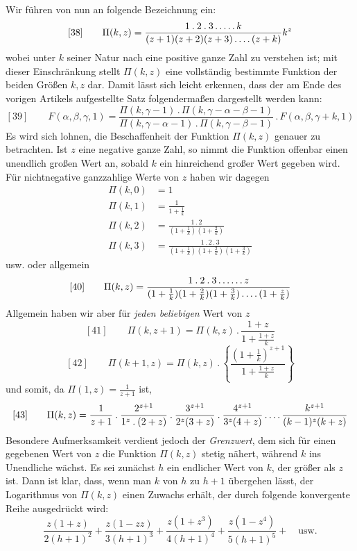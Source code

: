 Wir führen von nun an folgende Bezeichnung ein:
\[
[38]\qquad \Pi(k,z)=\frac{1\mathbin{.}2\mathbin{.}3\mathinner{.\,.\,.\,.\,.}k}{(z+1)(z+2)(z+3)\mathinner{.\,.\,.\,.}(z+k)}k^z
\]
wobei unter $k$ seiner Natur nach eine positive ganze Zahl zu verstehen ist; mit dieser Einschränkung stellt $\Pi(k,z)$ eine vollständig bestimmte Funktion der beiden Größen $k,z$ dar. Damit lässt sich leicht erkennen, dass der am Ende des vorigen Artikels aufgestellte Satz folgendermaßen dargestellt werden kann:
\[
[39]\qquad F(\alpha,\beta,\gamma,1)=\frac{\Pi(k,\gamma-1)\mathbin{.}\Pi(k,\gamma-\alpha-\beta-1)}{\Pi(k,\gamma-\alpha-1)\mathbin{.}\Pi(k,\gamma-\beta-1)}\mathbin{.}F(\alpha,\beta,\gamma+k,1)
\]
Es wird sich lohnen, die Beschaffenheit der Funktion $\Pi(k,z)$ genauer zu betrachten. Ist $z$ eine negative ganze Zahl, so nimmt die Funktion offenbar einen unendlich großen Wert an, sobald $k$ ein hinreichend großer Wert gegeben wird. Für nichtnegative ganzzahlige Werte von $z$ haben wir dagegen
\[
\begin{aligned}
\Pi(k,0)&=1\\[5pt]
\Pi(k,1)&=\frac{1}{1+\frac1k}\\[5pt]
\Pi(k,2)&=\frac{1\mathbin{.}2}{(1+\frac1k)(1+\frac2k)}\\[5pt]
\Pi(k,3)&=\frac{1\mathbin{.}2\mathbin{.}3}{(1+\frac1k)(1+\frac2k)(1+\frac3k)}
\end{aligned}
\]
usw. oder allgemein
\[
[40]\qquad \Pi(k,z)=\frac{1\mathbin{.}2\mathbin{.}3\mathinner{.\,.\,.\,.\,.\,.}z}{(1+\frac1k)(1+\frac2k)(1+\frac3k)\mathinner{.\,.\,.\,.}(1+\frac zk)}
\]
Allgemein haben wir aber für \textit{jeden beliebigen} Wert von $z$
\[
[41]\qquad \Pi(k,z+1)=\Pi(k,z)\mathbin{.}\frac{1+z}{1+\frac{1+z}{k}}
\]
\[
[42]\qquad \Pi(k+1,z)=\Pi(k,z)\mathbin{.}\left\{\frac{(1+\frac1k)^{z+1}}{1+\frac{1+z}{k}}\right\}
\]
und somit, da $\Pi(1,z)=\frac1{z+1}$ ist,
\[
[43]\qquad \Pi(k,z)=\frac1{z+1}\mathbin{.}\frac{2^{z+1}}{1^z\mathbin{.}(2+z)}\mathbin{.}\frac{3^{z+1}}{2^z(3+z)}\mathbin{.}\frac{4^{z+1}}{3^z(4+z)}\mathinner{.\,.\,.\,.}\frac{k^{z+1}}{(k-1)^z(k+z)}
\]
Besondere Aufmerksamkeit verdient jedoch der \textit{Grenzwert}, dem sich für einen gegebenen Wert von $z$ die Funktion $\Pi(k,z)$ stetig nähert, während $k$ ins Unendliche wächst. Es sei zunächst $h$ ein endlicher Wert von $k$, der größer als $z$ ist. Dann ist klar, dass, wenn man $k$ von $h$ zu $h+1$ übergehen lässt, der Logarithmus von $\Pi(k,z)$ einen Zuwachs erhält, der durch folgende konvergente Reihe ausgedrückt wird:
\[
\frac{z(1+z)}{2(h+1)^2}+\frac{z(1-zz)}{3(h+1)^3}+\frac{z(1+z^3)}{4(h+1)^4}+\frac{z(1-z^4)}{5(h+1)^5}+\quad\text{usw.}
\]
